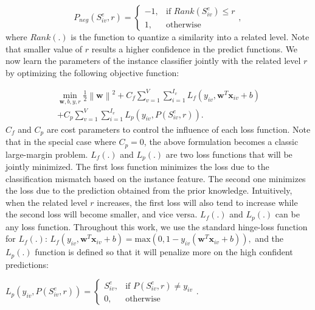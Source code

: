 \begin{equation}
\label{eq3}
P_{neg}(S_{iv}^{e},r) = 
\begin{cases}
-1,& \text{if } Rank(S_{iv}^{e}) \leq r \\
1,              & \text{otherwise}
\end{cases}\text{, }
\end{equation}
where $Rank(.)$ is the function to quantize a similarity into a related level. Note that smaller value of $r$ results a higher confidence in the predict functions. We now learn the parameters of the instance classifier jointly with the related level $r$ by optimizing the following objective function: 

\begin{equation}
\label{eq4}
\begin{split}
\min_{\textbf{w},b,y,r} \frac{1}{2} \left \| \textbf{w} \right \|^{2} + C_{f} \sum_{v=1}^{V}\sum_{i=1}^{I_{v}}L_{f}\left ( y_{iv}, \textbf{w}^{T}\textbf{x}_{iv}+b \right ) \\
+ C_{p} \sum_{v=1}^{V}\sum_{i=1}^{I_{v}}L_{p}\left ( y_{iv}, P(S_{iv}^{e},r) \right ).
\end{split}
\end{equation}
$C_{f}$ and $C_{p}$ are cost parameters to control the influence of each loss function. Note that in the special case where $C_{p}=0$, the above formulation becomes a classic large-margin problem. $L_{f}(.)$ and $L_{p}(.)$ are two loss functions that will be jointly minimized. The first loss function minimizes the loss due to the classification mismatch based on the instance feature. The second one minimizes the loss due to the prediction obtained from the prior knowledge. Intuitively, when the related level $r$ increases, the first loss will also tend to increase while the second loss will become smaller, and vice versa. $L_{f}(.)$ and $L_{p}(.)$ can be any loss function. Throughout this work, we use the standard hinge-loss function for $L_{f}(.)$: 
$L_{f}\left ( y_{iv},\textbf{w}^{T}\textbf{x}_{iv}+b \right )=\text{max}(0,1-y_{iv}(\textbf{w}^{T}\textbf{x}_{iv}+b)),$
and the $L_{p}(.)$ function is defined so that it will penalize more on the high confident predictions:
\begin{center}
$L_{p}\left ( y_{iv}, P(S_{iv}^{e},r) \right )= 
\begin{cases}
S_{iv}^{e},& \text{if } P(S_{iv}^{e},r) \neq y_{iv} \\
0,              & \text{otherwise}
\end{cases}.$
\end{center}

